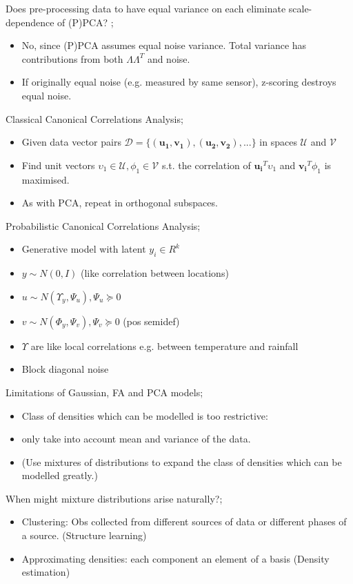 \documentclass{article}
\begin{document}
Does pre-processing data to have equal variance on each eliminate scale-dependence of (P)PCA? ;\begin{itemize} \item No, since (P)PCA assumes equal noise variance. Total variance has contributions from both $\Lambda\Lambda^T$ and noise.  \item If originally equal noise (e.g. measured by same sensor), z-scoring destroys equal noise.  \end{itemize}

Classical Canonical Correlations Analysis; \begin{itemize} \item Given data vector pairs $\mathcal{D}=\{(\mathbf{u_1, v_1}), \mathbf{(u_2, v_2)},...\}$ in spaces $\mathcal{U}$ and $\mathcal{V}$ \item Find unit vectors $\upsilon_1\in\mathcal{U}, \phi_1\in\mathcal{V}$ s.t. the correlation of $\mathbf{u_i}^T\upsilon_1$ and $\mathbf{v_i}^T\phi_1$ is maximised.  \item As with PCA, repeat in orthogonal subspaces.  \end{itemize}

Probabilistic Canonical Correlations Analysis; \begin{itemize} \item Generative model with latent $y_i\in R^k$ \item $y\sim N(0,I)$ (like correlation between locations) \item $u\sim N(\Upsilon_y, \Psi_u), \Psi_u \succeq 0$ \item $v\sim N(\Phi_y, \Psi_v), \Psi_v \succeq 0$ (pos semidef) \item $\Upsilon$ are like local correlations e.g. between temperature and rainfall \item Block diagonal noise \end{itemize}

Limitations of Gaussian, FA and PCA models; \begin{itemize} \item Class of densities which can be modelled is too restrictive: \item only take into account mean and variance of the data.  \item (Use mixtures of distributions to expand the class of densities which can be modelled greatly.) \end{itemize}

When might mixture distributions arise naturally?; \begin{itemize} \item Clustering: Obs collected from different sources of data or different phases of a source. (Structure learning) \item Approximating densities: each component an element of a basis (Density estimation) \end{itemize}
\end{document}
